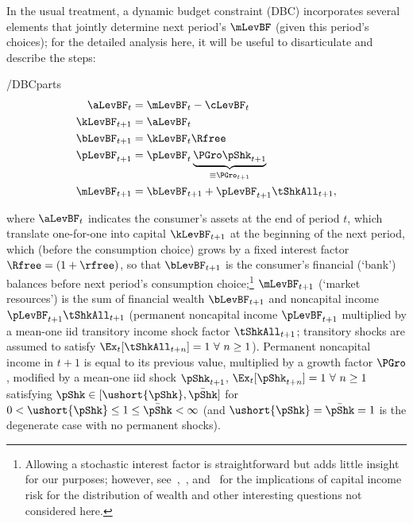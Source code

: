 \documentclass[BufferStockTheory]{subfiles}
\begin{document}
In the usual treatment, a dynamic budget constraint (DBC) incorporates
several elements that jointly determine next period's $\mLevBF$ (given this
period's choices); for the detailed analysis here, it will be useful to
disarticulate and describe the steps:\hypertarget{DBCParts}{}
\begin{verbatimwrite}{\EqDir/DBCparts}
  \begin{align}
    \aLevBF_{t}    & = \mLevBF_{t}-\cLevBF_{t}  \label{eq:DBCparts} \\
    \kLevBF_{t+1}   & = \aLevBF_{t} \notag \\
    \bLevBF_{t+1}    & = \kLevBF_{t} \Rfree \notag \\
    \pLevBF_{t+1}  & = \pLevBF_{t} \underbrace{\PGro\pShk_{t+1}}_{\equiv \PGro_{t+1}}  \notag \\
    \mLevBF_{t+1}  & =  \bLevBF_{t+1} +\pLevBF_{t+1}\tShkAll_{t+1},  \notag
  \end{align}
\end{verbatimwrite}

where $\aLevBF_{t}$ indicates the consumer's assets at the end of period $t$, which translate one-for-one into capital $\kLevBF_{t+1}$ at the beginning of the next period, which (before the consumption choice) grows by a fixed interest factor $\Rfree =(1+\rfree)$,  so that $\bLevBF_{t+1}$ is the consumer's financial (`bank') balances before next period's consumption choice;\footnote{Allowing a stochastic interest factor is straightforward but adds little insight for our purposes; however, see~\cite{benhabibWealth},~\cite{maTodaRich}, and~\cite{mstIncFluct} for the implications of capital income risk for the distribution of wealth and other interesting questions not considered here.} $\mLevBF_{t+1}$ (`market resources') is the sum of financial wealth $\bLevBF_{t+1}$ and noncapital income $\pLevBF_{t+1}\tShkAll_{t+1}$ (permanent noncapital income $\pLevBF_{t+1}$ multiplied by a mean-one iid transitory income shock factor $\tShkAll_{t+1}$; transitory shocks are assumed to satisfy $\Ex_{t}[{\tShkAll}_{t+n}]=1~\forall~n\geq 1$). Permanent noncapital income in $t+1$ is equal to its previous value, multiplied by a growth factor $\PGro$, modified by a mean-one iid shock $\pShk_{t+1}$, $\Ex_{t}[{\pShk}_{t+n}]=1~\forall~n \geq 1$ satisfying $\pShk \in [\ushort{\pShk},\bar{\pShk}]$ for $0 < \ushort{\pShk} \leq 1 \leq \bar{\pShk} < \infty$ (and $\ushort{\pShk}=\bar{\pShk}=1$ is the degenerate case with no permanent shocks).
\end{document}
